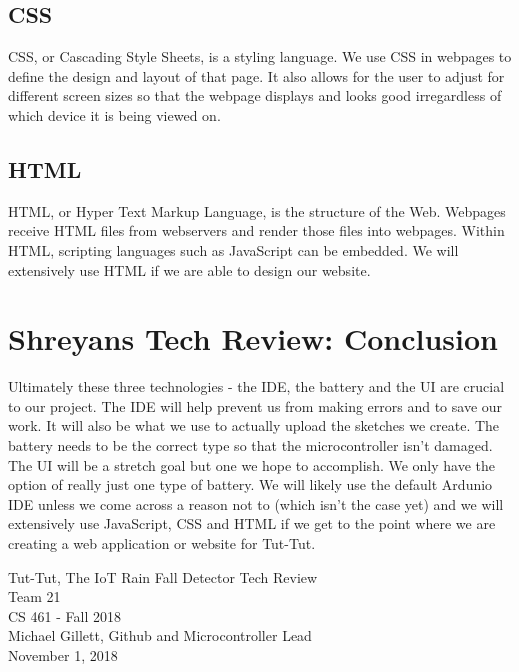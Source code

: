 \documentclass[letterpaper,10pt,draftclsnofoot,onecolumn]{article}
\begin{document}
\subsection{CSS}
CSS, or Cascading Style Sheets, is a styling language. We use CSS in webpages to define the design and layout of that page. It also allows for the user to adjust for different screen sizes so that the webpage displays and looks good irregardless of which device it is being viewed on. \cite{W3Schools}

\subsection{HTML}
HTML, or Hyper Text Markup Language, is the structure of the Web. Webpages receive HTML files from webservers and render those files into webpages. Within HTML, scripting languages such as JavaScript can be embedded. We will extensively use HTML if we are able to design our website.
\cite{WikiHTML}

\section{Shreyans Tech Review: Conclusion}

Ultimately these three technologies - the IDE, the battery and the UI are crucial to our project. The IDE will help prevent us from making errors and to save our work. It will also be what we use to actually upload the sketches we create. The battery needs to be the correct type so that the microcontroller isn't damaged. The UI will be a stretch goal but one we hope to accomplish. We only have the option of really just one type of battery. We will likely use the default Ardunio IDE unless we come across a reason not to (which isn't the case yet) and we will extensively use JavaScript, CSS and HTML if we get to the point where we are creating a web application or website for Tut-Tut.




\begin{titlepage}
\vspace*{\fill}
\begin{center}
{\Large Tut-Tut, The IoT Rain Fall Detector Tech Review}
\\[0.3cm]

{\large Team 21}
\\[0.3cm]

{\large CS 461 - Fall 2018}
\\[0.3cm]

{\large Michael Gillett, Github and Microcontroller Lead}
\\[0.3cm]

{\large November 1, 2018}
\\[1cm]

\end{center}
\vspace*{\fill}
\end{titlepage}
\end{document}
